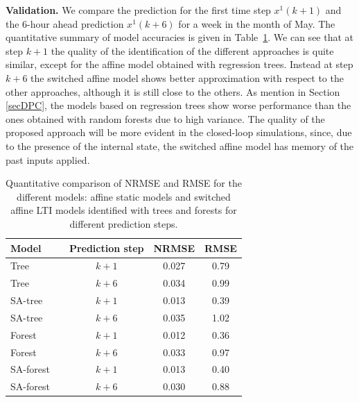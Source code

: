 \documentclass[]{ifacconf}  %
\begin{document}
\textbf{Validation.} We compare the prediction for the first time step $x^1(k+1)$ and the 6-hour ahead prediction $x^1(k+6)$ for a week in the month of May. The quantitative summary of model accuracies is given in Table~\ref{T:validation}. We can see that at step $k+1$ the quality of the identification of the different approaches is quite similar, except for the affine model obtained with regression trees. Instead at step $k+6$ the switched affine model shows better approximation with respect to the other approaches, although it is still close to the others. As mention in Section \ref{secDPC}, the models based on regression trees show worse performance than the ones obtained with random forests due to high variance. The quality of the proposed approach will be more evident in the closed-loop simulations, since, due to the presence of the internal state, the switched affine model has memory of the past inputs applied.
\begin{table}[t!]
	\centering
	\begin{tabular}{lcccc}
		\toprule
		Model     &  & Prediction step & NRMSE & RMSE   \\ 
		\midrule
		Tree      &  & $k+1$           & 0.027  & 0.79  \\
		Tree      &  & $k+6$           & 0.034  & 0.99  \\
		SA-tree   &  & $k+1$           & 0.013  & 0.39  \\
		SA-tree   &  & $k+6$           & 0.035  & 1.02  \\
		Forest    &  & $k+1$           & 0.012  & 0.36  \\
		Forest    &  & $k+6$           & 0.033  & 0.97  \\
		SA-forest &  & $k+1$           & 0.013  & 0.40  \\
		SA-forest &  & $k+6$           & 0.030  & 0.88  \\
		\bottomrule
	\end{tabular}
	\caption{Quantitative comparison of NRMSE and RMSE for the different models: affine static models and switched affine LTI models identified with trees and forests for different prediction steps.}
	\label{T:validation}
	\vspace{-0.2cm}
\end{table}

\end{document}
